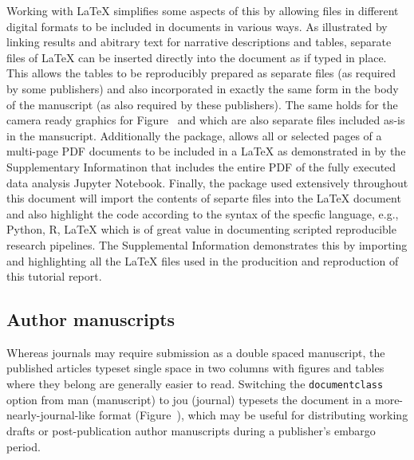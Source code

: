 \documentclass[helv,10pt,man,floatsintext]{apa6}  %
\begin{document}
Working with \LaTeX{} simplifies some aspects of this by allowing
files in different digital formats to be included in documents in
various ways. As illustrated by linking results and abitrary text for
narrative descriptions and tables, separate files of \LaTeX{} can be
inserted directly into the document as if typed in place. This allows
the tables to be reproducibly prepared as separate files (as required
by some publishers) and also incorporated in exactly the same form in
the body of the manuscript (as also required by these publishers). The
same holds for the camera ready graphics for Figure~ and
 which are also separate files included as-is in the
mansucript. Additionally the \texttt{} package,
allows all or selected pages of a multi-page PDF documents to be
included in a \LaTeX{} as demonstrated in by the Supplementary
Informatinon that includes the entire PDF of the fully executed data
analysis Jupyter Notebook.  Finally, the \texttt{\minted}
package used extensively throughout this document will import the
contents of separte files into the \LaTeX{} document and also
highlight the code according to the syntax of the specfic language,
e.g., Python, R, \LaTeX{} which is of great value in documenting
scripted reproducible research pipelines. The Supplemental Information
demonstrates this by importing and highlighting all the \LaTeX{} files
used in the producition and reproduction of this tutorial report.

\subsection{Author manuscripts}

Whereas journals may require submission as a double spaced manuscript,
the published articles typeset single space in two columns with
figures and tables where they belong are generally easier to read.
Switching the \texttt{documentclass} option from man
(manuscript) to jou (journal) typesets the document in a
more-nearly-journal-like format (Figure~), which
may be useful for distributing working drafts or post-publication
author manuscripts during a publisher's embargo period.
\end{document}
